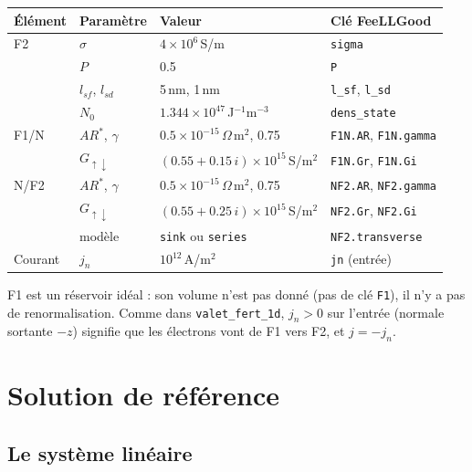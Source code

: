\documentclass[11pt,a4paper]{article}
\begin{document}
\begin{center}
\renewcommand{\arraystretch}{1.2}
\begin{tabular}{llll}
  \toprule
  Élément & Paramètre & Valeur & Clé FeeLLGood \\
  \midrule
  F2 & $\sigma$ & $4\times10^6$\,S/m & \texttt{sigma} \\
    & $P$ & 0.5 & \texttt{P} \\
    & $l_{sf}$, $l_{sd}$ & 5\,nm, 1\,nm & \texttt{l\_sf}, \texttt{l\_sd} \\
    & $N_0$ & $1.344\times10^{47}$\,J$^{-1}$m$^{-3}$ & \texttt{dens\_state} \\
  F1/N & $AR^*$, $\gamma$ & $0.5\times10^{-15}\,\Omega\,$m$^2$, 0.75
    & \texttt{F1N.AR}, \texttt{F1N.gamma} \\
    & $G_{\uparrow\downarrow}$ & $(0.55 + 0.15\,i)\times10^{15}$\,S/m$^2$
    & \texttt{F1N.Gr}, \texttt{F1N.Gi} \\
  N/F2 & $AR^*$, $\gamma$ & $0.5\times10^{-15}\,\Omega\,$m$^2$, 0.75
    & \texttt{NF2.AR}, \texttt{NF2.gamma} \\
    & $G_{\uparrow\downarrow}$ & $(0.55 + 0.25\,i)\times10^{15}$\,S/m$^2$
    & \texttt{NF2.Gr}, \texttt{NF2.Gi} \\
    & modèle & \texttt{sink} ou \texttt{series} & \texttt{NF2.transverse} \\
  Courant & $j_n$ & $10^{12}$\,A/m$^2$ & \texttt{jn} (entrée) \\
  \bottomrule
\end{tabular}
\end{center}
F1 est un réservoir idéal : son volume n'est pas donné (pas de clé
\texttt{F1}), il n'y a pas de renormalisation. Comme dans
\texttt{valet\_fert\_1d}, $j_n > 0$ sur l'entrée (normale sortante $-z$)
signifie que les électrons vont de F1 vers F2, et $j = -j_n$.

\section{Solution de référence}

\subsection{Le système linéaire}
\end{document}
